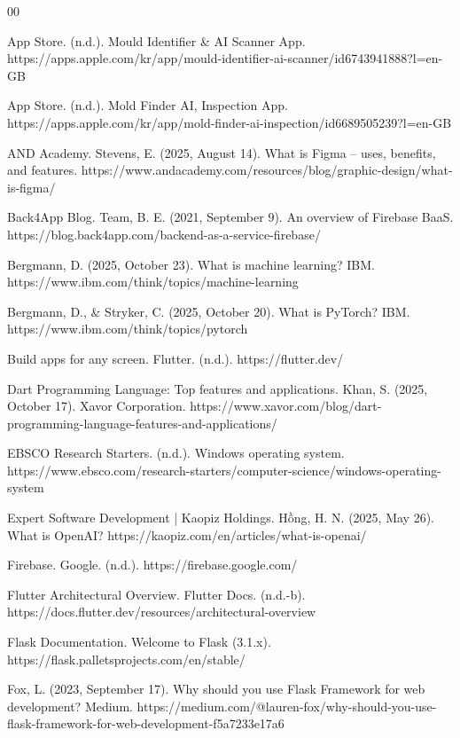 \documentclass[conference]{IEEEtran}
\begin{document}
\begin{thebibliography}{00}

App Store. (n.d.). Mould Identifier \& AI Scanner App. https://apps.apple.com/kr/app/mould-identifier-ai-scanner/id6743941888?l=en-GB

App Store. (n.d.). Mold Finder AI, Inspection App. https://apps.apple.com/kr/app/mold-finder-ai-inspection/id6689505239?l=en-GB

AND Academy. Stevens, E. (2025, August 14). What is Figma – uses, benefits, and features. https://www.andacademy.com/resources/blog/graphic-design/what-is-figma/

Back4App Blog. Team, B. E. (2021, September 9). An overview of Firebase BaaS. https://blog.back4app.com/backend-as-a-service-firebase/

Bergmann, D. (2025, October 23). What is machine learning? IBM. https://www.ibm.com/think/topics/machine-learning

Bergmann, D., \& Stryker, C. (2025, October 20). What is PyTorch? IBM. https://www.ibm.com/think/topics/pytorch

Build apps for any screen. Flutter. (n.d.). https://flutter.dev/

Dart Programming Language: Top features and applications. Khan, S. (2025, October 17). Xavor Corporation. https://www.xavor.com/blog/dart-programming-language-features-and-applications/

EBSCO Research Starters. (n.d.). Windows operating system. https://www.ebsco.com/research-starters/computer-science/windows-operating-system

Expert Software Development | Kaopiz Holdings. Hồng, H. N. (2025, May 26). What is OpenAI? https://kaopiz.com/en/articles/what-is-openai/

Firebase. Google. (n.d.). https://firebase.google.com/

Flutter Architectural Overview. Flutter Docs. (n.d.-b). https://docs.flutter.dev/resources/architectural-overview

Flask Documentation. Welcome to Flask (3.1.x). https://flask.palletsprojects.com/en/stable/

Fox, L. (2023, September 17). Why should you use Flask Framework for web development? Medium. https://medium.com/@lauren-fox/why-should-you-use-flask-framework-for-web-development-f5a7233e17a6


\end{thebibliography}
\end{document}
